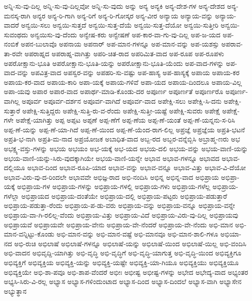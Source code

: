 {ಅನ್ನಿ-ಸು-ವು-ದಿಲ್ಲ
ಅನ್ನಿ-ಸು-ವು-ದಿಲ್ಲವೋ
ಅನ್ನಿ-ಸು-ವುದು
ಅನ್ನು
ಅನ್ಯ
ಅನ್ಯಕಿ
ಅನ್ಯ-ದೇಶ-ಗಳ
ಅನ್ಯ-ದೇಶದ
ಅನ್ಯ-ಮನಸ್ಕ-ರಾಗಿ
ಅನ್ಯರ
ಅನ್ಯ-ರಿ-ಗಾಗಿ
ಅನ್ಯ-ರಿಗೆ
ಅನ್ಯ-ರಿ-ಗೋಸ್ಕರ
ಅನ್ಯ-ವೀರ
ಅನ್ಯಾಯ
ಅನ್ಯಾಯ-ವನ್ನು
ಅನ್ಯಾಯ-ವಾದರೆ
ಅನ್ವಯಿ-ಸಲು
ಅನ್ವಯಿ-ಸುತ್ತದೆ
ಅನ್ವಯಿ-ಸುತ್ತ-ದೆಯೆ
ಅನ್ವಯಿ-ಸುತ್ತ-ದೆಯೋ
ಅನ್ವಯಿ-ಸುತ್ತೀರಿ
ಅನ್ವಯಿ-ಸುವಂಥದು
ಅನ್ವಯಿಸು-ವು-ದೆಂದು
ಅನ್ವೇಷ-ಕರು
ಅನ್ವೇಷಣೆ
ಅಪ-ಕಾರ-ವಾ-ಗು-ವು-ದಿಲ್ಲ
ಅಪ-ಜ-ಯದ
ಅಪ-ನಂಬಿಕೆ
ಅಪನ-ಬುಲಾವೊ
ಅಪನಾಯ
ಅಪನಾರ್
ಅಪ-ಮಾನ-ಗಳನ್ನೂ
ಅಪ-ಮಾನ-ವನ್ನು
ಅಪ-ಯಶಸ್ಸು
ಅಪರಾವ-ತಾ-ರವೇ
ಅಪರಾಹ್ನದ
ಅಪರಾಹ್ನ-ವಾಗಿತ್ತು
ಅಪರಿ-ಚಿತ-ರಾದ
ಅಪರಿಮಿತ-ವಾದ
ಅಪ-ರೂಪ
ಅಪ-ರೂಪಳು
ಅಪರೋಕ್ಷಾನು-ಭೂತಿ
ಅಪರೋಕ್ಷಾನು-ಭೂತಿ-ಯನ್ನು
ಅಪರೋಕ್ಷಾನು-ಭೂತಿ-ಯೆಂದು
ಅಪ-ವಾದ-ಗಳನ್ನು
ಅಪ-ವಾದ-ವನ್ನು
ಅಪವಿತ್ರ-ವಾದ
ಅಪಸ್ವರ-ವನ್ನು
ಅಪಹರಿ-ಸು-ವಷ್ಟು
ಅಪ-ಹಾಸ್ಯ
ಅಪ-ಹಾಸ್ಯಕ್ಕೆ
ಅಪಾಯ
ಅಪಾಯ-ಕರ
ಅಪಾಯ-ಕರ-ವಾದ
ಅಪಾಯ-ಕಾರಿ
ಅಪಾ-ಯಕ್ಕೆ
ಅಪಾಯ-ಗಳಿವೆ
ಅಪಾ-ಯದ
ಅಪಾಯ-ದಿಂದಲೂ
ಅಪಾಯ-ವಿಲ್ಲ
ಅಪಾ-ಯವು
ಅಪಾರ
ಅಪಾರ-ವಾದ
ಅಪಾರ್ಥ-ಮಾಡಿ-ಕೊಂಡು-ದರ
ಅಪೂರ್ಣ
ಅಪೂರ್ಣತೆ
ಅಪೂರ್ಣರೊ
ಅಪೂರ್ಣ-ವಾಗಿಲ್ಲ
ಅಪೂರ್ವ
ಅಪೂರ್ವ-ದರ್ಶನ
ಅಪೂರ್ವ-ವಾಗಿದೆ
ಅಪೂರ್ವ-ವಾದ
ಅಪೇಕ್ಷಿ-ಸಲು
ಅಪೇಕ್ಷಿ-ಸಿ-ದನು
ಅಪೇಕ್ಷಿ-ಸುತ್ತಾರೆ
ಅಪೇಕ್ಷಿ-ಸುತ್ತಿದ್ದರು
ಅಪೇಕ್ಷಿ-ಸುತ್ತಿ-ರು-ವ-ರೆಂದು
ಅಪೇಕ್ಷಿ-ಸುತ್ತೀ-ಯಷ್ಟೆ
ಅಪೇಕ್ಷಿ-ಸುವರು
ಅಪೇಕ್ಷೆ
ಅಪೇಕ್ಷೆ-ಗಳೇ
ಅಪೇಕ್ಷೆ-ಯಾಗಿತ್ತು
ಅಪ್ಪ
ಅಪ್ಪಟ
ಅಪ್ಪಣೆ
ಅಪ್ಪ-ಣೆಗೆ
ಅಪ್ಪ-ಣೆಯ
ಅಪ್ಪ-ಣೆ-ಯಂತೆ
ಅಪ್ಪ-ಣೆ-ಯನ್ನನು-ಸ-ರಿಸಿ
ಅಪ್ಪ-ಣೆ-ಯನ್ನು
ಅಪ್ಪ-ಣೆ-ಯಾ-ಗಿದೆ
ಅಪ್ಪ-ಣೆ-ಯಿಂದ
ಅಪ್ಪ-ಣೆ-ಯೆಂದ-ರಾಗ-ಲಿಲ್ಲ
ಅಪ್ರಜ್ಞೆ
ಅಪ್ರಜ್ಞೆಯ
ಅಪ್ರತಿ-ಭಟನೆ
ಅಪ್ರತಿ-ಭ-ನಾಗಿ
ಅಪ್ರತಿ-ಮ-ನಾದ
ಅಪ್ರಯೋಜಕ
ಅಬಾಧಿತ-ವಾದ
ಅಬ್ಬ-ರದ
ಅಬ್ಬರ-ವನ್ನೆಬ್ಬಿಸಿ
ಅಬ್ರಾಹ್ಮ-ಣರು
ಅಭ
ಅಭಕ್ಷ್ಯ-ವಸ್ತು-ಗಳನ್ನು
ಅಭಯ
ಅಭಯಂ
ಅಭ-ಯಕ್ಕೆ
ಅಭ-ಯದ
ಅಭಯ-ದಲಿ
ಅಭಯ-ವನ್ನು
ಅಭಯ-ವಾಣಿ-ಯನ್ನು
ಅಭಯ-ವಾಣಿ-ಯನ್ನು-ಸಿರು-ವುದಕ್ಕಾಗಿಯೇ
ಅಭಯ-ವಾಣಿ-ಯನ್ನೇ
ಅಭಾವ
ಅಭಾವ-ಗಳನ್ನೂ
ಅಭಾವದ
ಅಭಾವ-ದಲ್ಲಿಯೂ
ಅಭಾವ-ದಿಂದ
ಅಭಾವ-ರೂಪಿ-ಯಾದ
ಅಭಾವ-ವನ್ನು
ಅಭಾವ-ವನ್ನೂ
ಅಭಾವ-ವಿತ್ತು
ಅಭಾವ-ವಿ-ದೆಯೋ
ಅಭಾವ-ವಿರು-ವು-ದ-ರಿಂದಲೇ
ಅಭಾವವೇ
ಅಭಿಜ್ಞ-ರಾದ
ಅಭಿ-ನಂದಿಸಿ
ಅಭಿನ್ನ
ಅಭಿನ್ನ-ವಾದ
ಅಭಿಪ್ರಾಯ
ಅಭಿಪ್ರಾ-ಯಕ್ಕೆ
ಅಭಿಪ್ರಾಯ-ಗಳ
ಅಭಿಪ್ರಾಯ-ಗಳನ್ನು
ಅಭಿಪ್ರಾಯ-ಗಳಲ್ಲಿ
ಅಭಿಪ್ರಾಯ-ಗಳು
ಅಭಿಪ್ರಾಯ-ಗಳೆಲ್ಲ
ಅಭಿಪ್ರಾಯ-ಗಳೆಲ್ಲಾ
ಅಭಿಪ್ರಾಯದ
ಅಭಿಪ್ರಾಯ-ದಂತೆಯೇ
ಅಭಿಪ್ರಾಯ-ದಲ್ಲಿ
ಅಭಿಪ್ರಾಯ-ಪಟ್ಟರು
ಅಭಿಪ್ರಾಯ-ಪಡುತ್ತಾರೆ
ಅಭಿಪ್ರಾಯ-ಪಡುತ್ತಾ-ರೆಂದು
ಅಭಿಪ್ರಾಯ-ಪ-ಡು-ವರು
ಅಭಿಪ್ರಾಯ-ವನ್ನು
ಅಭಿಪ್ರಾಯ-ವನ್ನೂ
ಅಭಿಪ್ರಾಯ-ವನ್ನೇ
ಅಭಿಪ್ರಾಯ-ವಾ-ಗಿ-ರಲಿಲ್ಲ-ವೆಂದು
ಅಭಿಪ್ರಾಯ-ವಿತ್ತು
ಅಭಿಪ್ರಾಯ-ವಿದೆ
ಅಭಿಪ್ರಾಯ-ವಿರು-ವು-ದಿಲ್ಲ
ಅಭಿಪ್ರಾಯವು
ಅಭಿಪ್ರಾಯವೆ
ಅಭಿಪ್ರಾಯವೇ
ಅಭಿಪ್ರಾಯ-ವೇನು
ಅಭಿಪ್ರಾಯ-ವೇ-ನೆಂದರೆ
ಅಭಿಪ್ರಾಯ-ವೇ-ನೆಂದು
ಅಭಿ-ಮಾನ
ಅಭಿ-ಮಾನ-ವನ್ನಿಟ್ಟು-ಕೊಂಡು
ಅಭಿ-ಮಾನ-ವನ್ನು
ಅಭಿ-ಮಾನ-ವಷ್ಟೆ
ಅಭಿ-ಮಾನವೂ
ಅಭಿ-ಮಾನ-ಶಾಲಿ-ಗಳೂ
ಅಭಿಯಾ-ನದ
ಅಭಿ-ರುಚಿ
ಅಭಿಲಾಷೆ
ಅಭಿಲಾಷೆ-ಗಳನ್ನೂ
ಅಭಿಲಾಷೆ-ಯನ್ನು
ಅಭಿಲಾಷೆ-ಯಿಂದ
ಅಭಿಲಾಷೆ-ಯಿಲ್ಲ
ಅಭಿ-ವಂದಿಸಿ
ಅಭಿ-ವಾದನ
ಅಭಿವೃದ್ದಿ-ಯಾಗಿತ್ತು
ಅಭಿ-ವೃದ್ಧಿ
ಅಭಿ-ವೃದ್ಧಿಗೆ
ಅಭಿ-ವೃದ್ಧಿ-ಯಾಗುತ್ತ
ಅಭಿ-ವೃದ್ಧಿ-ಯಿಂದ
ಅಭಿವ್ಯಕ್ತಿಗೂ
ಅಭಿವ್ಯಕ್ತಿಗೆ
ಅಭಿವ್ಯಕ್ತಿಯ
ಅಭಿವ್ಯಕ್ತಿ-ಯನ್ನು
ಅಭಿವ್ಯಕ್ತಿ-ಯಷ್ಟೇ
ಅಭಿವ್ಯಕ್ತಿ-ಯಾ-ಗಿಯೂ
ಅಭಿವ್ಯಕ್ತಿಯು
ಅಭಿವ್ಯಕ್ತಿಯೂ
ಅಭಿವ್ಯಕ್ತಿಯೇ
ಅಭಿ-ಶಾ-ಪವೂ
ಅಭಿ-ಶಾಪ-ವೆಂದರೆ
ಅಭೀಃ
ಅಭೀಷ್ಟ
ಅಭೀಷ್ಟ-ಗಳನ್ನು
ಅಭೇದ
ಅಭೇದ್ಯ-ವಾದ
ಅಭ್ಯಂತರ
ಅಭ್ಯಸಿ-ಸಿರು-ವಿ-ರಲ್ಲ
ಅಭ್ಯಾಸ
ಅಭ್ಯಾಸ-ಗಳಿಂದುಂಟಾದ
ಅಭ್ಯಾಸ-ದಿಂದ
ಅಭ್ಯಾಸ-ದಿಂದಲೆ
ಅಭ್ಯಾಸ-ವಾಗಿ
ಅಭ್ಯಾಸೇನ
ಅಭ್ಯುತ್ಥಾನ
}

